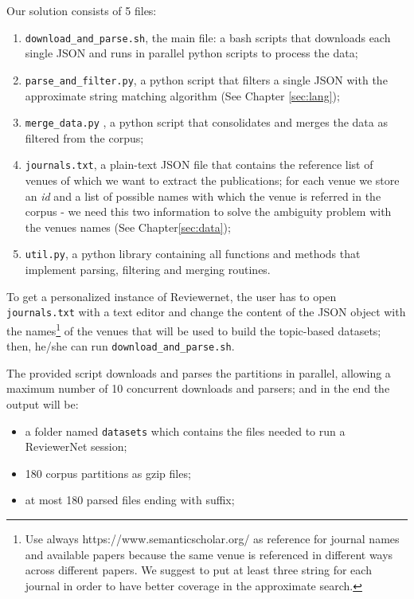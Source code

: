 Our solution consists of 5 files: 
\begin{enumerate}
\item \texttt{download\_and\_parse.sh}, the main file: a bash scripts that downloads each single JSON and runs in parallel python scripts to process the data;
\item \texttt{parse\_and\_filter.py}, a python script that filters a single JSON with the approximate string matching algorithm (See Chapter \ref{sec:lang});
\item \texttt{merge\_data.py} , a python script that consolidates and merges the data as filtered from the corpus;
\item \texttt{journals.txt}, a plain-text JSON file that contains the reference list of venues of which we want to extract the publications; for each venue we store an \emph{id} and a list of possible names with which the venue is referred in the corpus - we need this two information to solve the ambiguity problem with the venues names (See Chapter\ref{sec:data});
\item \texttt{util.py}, a python library containing all functions and methods that implement parsing, filtering and merging routines.
\end{enumerate}

To get a personalized instance of Reviewernet, the user has to open \texttt{journals.txt} with a text editor and change the content of the JSON object with the names\footnote{Use always https://www.semanticscholar.org/ as reference for journal names and available papers because the same venue is referenced in different ways across different papers. We suggest to put at least three string for each journal in order to have better coverage in the approximate search.} of the venues that will be used to build the topic-based datasets; then, he/she can run \texttt{download\_and\_parse.sh}.

The provided script downloads and parses the partitions in parallel, allowing a maximum number of 10 concurrent downloads and parsers; and in the end the output will be:


    \begin{itemize}
        \item a folder named \texttt{datasets} which contains the files needed to run a ReviewerNet session;

        \item 180 corpus partitions as gzip files;

        \item at most 180 parsed files ending with  suffix;
    \end{itemize}

